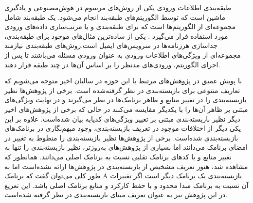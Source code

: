 طبقه‌بندی اطلاعات ورودی یکی از روش‌های مرسوم در هوش‌مصنوعی و یاد‌گیری ماشین است که توسط الگوریتم‌های طبقه‌بند انجام می‌شود. یک طبقه‌بند شامل مجموعه‌ای از الگوریتم‌ها است که برای طبقه‌بندی و یا مرتب‌سازی داده‌های ورودی مورد استفاده قرار می‌گیرد . یکی از ساده‌ترین مثال‌های موجود برای طبقه‌بندی، جدا‌سازی هرزنامه‌ها در سرویس‌های ایمیل است.روش‌های طبقه‌بندی نیازمند مجموعه‌ای از ویژگی‌های اطلاعات ورودی به عنوان ورودی مسئله‌ می‌باشند تا پس از اجرای الگوریتم، ورودی‌های مدنظر را بر اساس آن‌ها  در چند طبقه قرار دهند.



با پویش عمیق در پژوهش‌های مرتبط با این حوزه در سالیان اخیر متوجه می‌شویم که تعاریف متنوعی برای بازبسته‌بندی در نظر گرفته‌شده است. برخی از پژوهش‌ها نظیر  بازبسته‌بندی را در تغییر منابع و ظاهر برنامک‌ها در نظر می‌گیرند و در نهایت ویژگی‌های مبتنی بر ظاهر آن‌ها را با یکدیگر مقایسه می‌کنند در حالی که برخی از پژوهش‌های اخیر دیگر نظیر  باربسته‌بندی مبتنی بر تغییر ویژگی‌های کد‌پایه بیان شده‌است. علاوه بر این یکی دیگر از اختلافات موجود در تعریف بازبسته‌بندی، وجود مبهم‌نگاری در برنامک‌های بازبسته‌بندی شده‌است. برخی از پژوهش‌ها نظیر  بازبسته‌بندی را منطوط به تغییر در امضای برنامک می‌دانند اما بسیاری از پژوهش‌های به‌روز‌تر، نظیر  بازبسته‌بندی را تنها به نغییر منابع و یا کد‌های برنامک تقلبی نسبت به برنامک اصلی می‌دانند. همانطور که مشاهده‌ شد، هنوز تعریف مشخیص از بازبسته‌بندی در پژوهش‌ها ارائه‌ نشده‌است اما به طور کلی می‌توان گفت که برنامک A بازبسته‌بندی یک برنامک دیگر است اگر تغییرات آن نسبت به برنامک مبدا محدود و با حفظ کارکرد و منابع برنامک اصلی باشد. این تعریغ در این پژوهش نیز به عنوان تعریف مبنای بازبسته‌بندی در نظر گرفته شده‌است.








